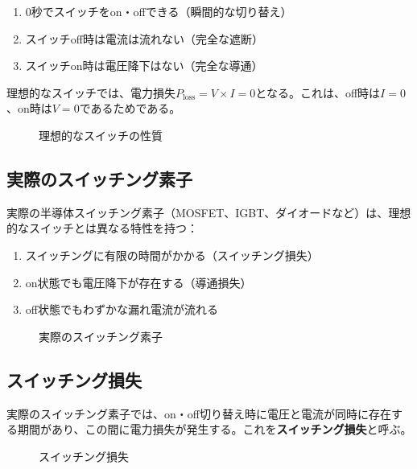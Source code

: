 \begin{enumerate}
\item 0秒でスイッチをon・offできる（瞬間的な切り替え）
\item スイッチoff時は電流は流れない（完全な遮断）
\item スイッチon時は電圧降下はない（完全な導通）
\end{enumerate}

理想的なスイッチでは、電力損失$P_{\text{loss}} = V \times I = 0$となる。これは、off時は$I = 0$、on時は$V = 0$であるためである。

\begin{figure}[H]
\centering
{}
\caption{理想的なスイッチの性質}
\label{fig:ideal_switch}
\end{figure}

\subsection{実際のスイッチング素子}

実際の半導体スイッチング素子（MOSFET、IGBT、ダイオードなど）は、理想的なスイッチとは異なる特性を持つ：

\begin{enumerate}
\item スイッチングに有限の時間がかかる（スイッチング損失）
\item on状態でも電圧降下が存在する（導通損失）
\item off状態でもわずかな漏れ電流が流れる
\end{enumerate}

\begin{figure}[H]
\centering
{}
\caption{実際のスイッチング素子}
\label{fig:real_switch}
\end{figure}

\subsection{スイッチング損失}

実際のスイッチング素子では、on・off切り替え時に電圧と電流が同時に存在する期間があり、この間に電力損失が発生する。これを\textbf{スイッチング損失}と呼ぶ。

\begin{figure}[H]
\centering
{}
\caption{スイッチング損失}
\label{fig:switching_loss}
\end{figure}

